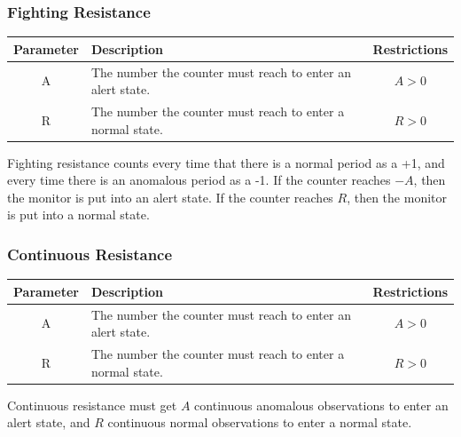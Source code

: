 \documentclass[12pt]{ucthesis}
\begin{document}
\subsubsection{Fighting Resistance}
\begin{table}[H]
   \begin{center}
      \begin{tabular}{|c|p{9cm}|c|}
         \hline
            Parameter & Description & Restrictions \\
         \hline
            A & The number the counter must reach to enter an alert state. & $ A > 0 $ \\
         \hline
            R & The number the counter must reach to enter a normal state. & $ R > 0 $ \\
         \hline
      \end{tabular}
   \end{center}
\end{table}

Fighting resistance counts every time that there is a normal period as a +1, and every time there is
an anomalous period as a -1. If the counter reaches $-A$, then the monitor is put into an alert state.
If the counter reaches $R$, then the monitor is put into a normal state.

\subsubsection{Continuous Resistance}
\begin{table}[H]
   \begin{center}
      \begin{tabular}{|c|p{9cm}|c|}
         \hline
            Parameter & Description & Restrictions \\
         \hline
            A & The number the counter must reach to enter an alert state. & $ A > 0 $ \\
         \hline
            R & The number the counter must reach to enter a normal state. & $ R > 0 $ \\
         \hline
      \end{tabular}
   \end{center}
\end{table}

Continuous resistance must get $A$ continuous anomalous observations to enter an alert state, and $R$ continuous normal
observations to enter a normal state.
\end{document}
